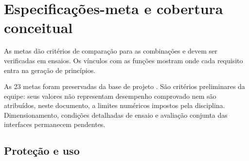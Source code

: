 \clearpage
\section{Especificações-meta e cobertura conceitual}
As metas dão critérios de comparação para as combinações e devem ser verificadas em ensaios. Os vínculos com as funções mostram onde cada requisito entra na geração de princípios.

As 23 metas foram preservadas da base de projeto \citep{baseequipe2026}. São critérios preliminares da equipe: seus valores não representam desempenho comprovado nem são atribuídos, neste documento, a limites numéricos impostos pela disciplina. Dimensionamento, condições detalhadas de ensaio e avaliação conjunta das interfaces permanecem pendentes.

\subsection{Proteção e uso}
